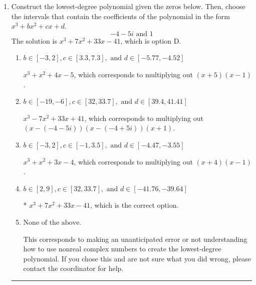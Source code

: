 \documentclass{extbook}[14pt]
\newcommand{\litem}[1]{\item #1

\rule{\textwidth}{0.4pt}}
\begin{document}
\begin{enumerate}\litem{
Construct the lowest-degree polynomial given the zeros below. Then, choose the intervals that contain the coefficients of the polynomial in the form $x^3+bx^2+cx+d$.
\[ -4 - 5 i \text{ and } 1 \]The solution is \( x^{3} +7 x^{2} +33 x -41 \), which is option D.\begin{enumerate}[label=\Alph*.]
\item \( b \in [-3, 2], c \in [3.3, 7.3], \text{ and } d \in [-5.77, -4.52] \)

$x^{3} + x^{2} +4 x -5$, which corresponds to multiplying out $(x + 5)(x -1)$.
\item \( b \in [-19, -6], c \in [32, 33.7], \text{ and } d \in [39.4, 41.41] \)

$x^{3} -7 x^{2} +33 x + 41$, which corresponds to multiplying out $(x-(-4 - 5 i))(x-(-4 + 5 i))(x + 1)$.
\item \( b \in [-3, 2], c \in [-1, 3.5], \text{ and } d \in [-4.47, -3.55] \)

$x^{3} + x^{2} +3 x -4$, which corresponds to multiplying out $(x + 4)(x -1)$.
\item \( b \in [2, 9], c \in [32, 33.7], \text{ and } d \in [-41.76, -39.64] \)

* $x^{3} +7 x^{2} +33 x -41$, which is the correct option.
\item \( \text{None of the above.} \)

This corresponds to making an unanticipated error or not understanding how to use nonreal complex numbers to create the lowest-degree polynomial. If you chose this and are not sure what you did wrong, please contact the coordinator for help.
\end{enumerate}

}
\end{enumerate}
\end{document}
